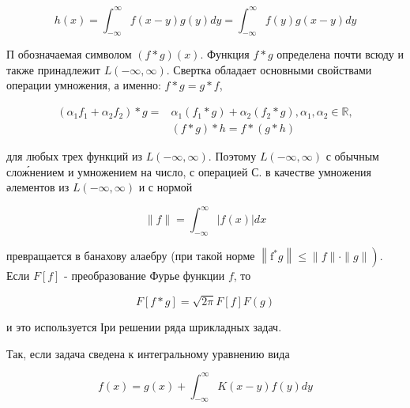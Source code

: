 \documentclass[10pt]{article}
\begin{document}
\[

h(x)=\int_{-\infty}^{\infty} f(x-y) g(y) d y=\int_{-\infty}^{\infty} f(y) g(x-y) d y

\]



П обозначаемая символом $(f * g)(x)$. Функция $f * g$ определена почти всюду и также принадлежит $L(-\infty, \infty)$. Свертка обладает основными свойствами операции умножения, а именно: $f * g=g * f$,



\[

\begin{aligned}

\left(\alpha_{1} f_{1}+\alpha_{2} f_{2}\right) * g= & \alpha_{1}\left(f_{1} * g\right)+\alpha_{2}\left(f_{2} * g\right), \alpha_{1}, \alpha_{2} \in \mathbb{R}, \\

& (f * g) * h=f *(g * h)

\end{aligned}

\]



для любых трех функций из $L(-\infty, \infty)$. Поэтому $L(-\infty, \infty)$ с обычным слож́нением и умножением на число, с операцией С. в качестве умножения әлементов из $L(-\infty, \infty)$ и с нормой



\[

\|f\|=\int_{-\infty}^{\infty}|f(x)| d x

\]



превращается в банахову алаебру (при такой норме $\left.\left\|\mathrm{f}^{*} g\right\| \leqslant\|f\| \cdot\|g\|\right)$. Если $F[f]$ - преобразование Фурье функции $f$, то



\[

F[f * g]=\sqrt{2 \pi} F[f] F(g)

\]



и это используется Іри решении ряда шрикладных задач.



Так, если задача сведена к интегральному уравнению вида



\[

f(x)=g(x)+\int_{-\infty}^{\infty} K(x-y) f(y) d y

\]
\end{document}
